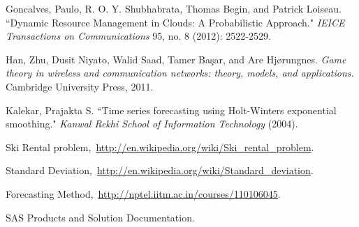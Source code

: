 \begin{thebibliography}{99}
 Goncalves, Paulo, R. O. Y. Shubhabrata, Thomas Begin, and Patrick Loiseau. ``Dynamic Resource Management in Clouds: A Probabilistic Approach." \emph{IEICE Transactions on Communications} 95, no. 8 (2012): 2522-2529.

 Han, Zhu, Dusit Niyato, Walid Saad, Tamer Başar, and Are Hjørungnes. \emph{Game theory in wireless and communication networks: theory, models, and applications.} Cambridge University Press, 2011.

 Kalekar, Prajakta S. ``Time series forecasting using Holt-Winters exponential smoothing." \emph{Kanwal Rekhi School of Information Technology} (2004).

 Ski Rental problem,\ \url{http://en.wikipedia.org/wiki/Ski_rental_problem}.

 Standard Deviation,\ \url{http://en.wikipedia.org/wiki/Standard_deviation}.

 Forecasting Method,\ \url{http://nptel.iitm.ac.in/courses/110106045}.

 SAS Products and Solution Documentation.

\end{thebibliography}
